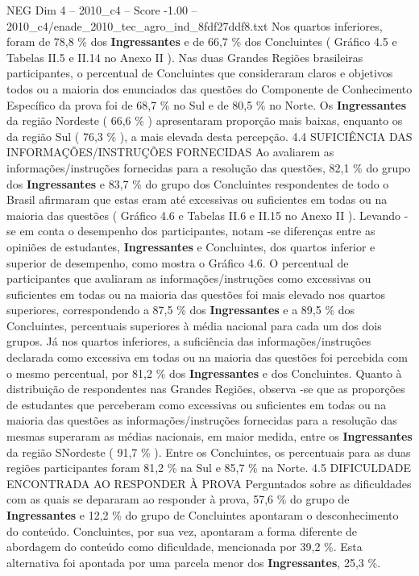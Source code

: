 \begin{textsample}{NEG Dim 4 – 2010\_c4 – Score -1.00 – 2010\_c4/enade\_2010\_tec\_agro\_ind\_8fdf27ddf8.txt}
Nos quartos inferiores, foram de 78,8 \% dos \textbf{Ingressantes} e de 66,7 \% dos Concluintes ( Gráfico 4.5 e Tabelas II.5 e II.14 no Anexo II ).
Nas duas Grandes Regiões brasileiras participantes, o percentual de Concluintes que consideraram claros e objetivos todos ou a maioria dos enunciados das questões do Componente de Conhecimento Específico da prova foi de 68,7 \% no Sul e de 80,5 \% no Norte.
Os \textbf{Ingressantes} da região Nordeste ( 66,6 \% ) apresentaram proporção mais baixas, enquanto os da região Sul ( 76,3 \% ), a mais elevada desta percepção. 4.4 SUFICIÊNCIA DAS INFORMAÇÕES/INSTRUÇÕES FORNECIDAS Ao avaliarem as informações/instruções fornecidas para a resolução das questões, 82,1 \% do grupo dos \textbf{Ingressantes} e 83,7 \% do grupo dos Concluintes respondentes de todo o Brasil afirmaram que estas eram até excessivas ou suficientes em todas ou na maioria das questões ( Gráfico 4.6 e Tabelas II.6 e II.15 no Anexo II ).
Levando -se em conta o desempenho dos participantes, notam -se diferenças entre as opiniões de estudantes, \textbf{Ingressantes} e Concluintes, dos quartos inferior e superior de desempenho, como mostra o Gráfico 4.6.
O percentual de participantes que avaliaram as informações/instruções como excessivas ou suficientes em todas ou na maioria das questões foi mais elevado nos quartos superiores, correspondendo a 87,5 \% dos \textbf{Ingressantes} e a 89,5 \% dos Concluintes, percentuais superiores à média nacional para cada um dos dois grupos.
Já nos quartos inferiores, a suficiência das informações/instruções declarada como excessiva em todas ou na maioria das questões foi percebida com o mesmo percentual, por 81,2 \% dos \textbf{Ingressantes} e dos Concluintes.
Quanto à distribuição de respondentes nas Grandes Regiões, observa -se que as proporções de estudantes que perceberam como excessivas ou suficientes em todas ou na maioria das questões as informações/instruções fornecidas para a resolução das mesmas superaram as médias nacionais, em maior medida, entre os \textbf{Ingressantes} da região SNordeste ( 91,7 \% ).
Entre os Concluintes, os percentuais para as duas regiões participantes foram 81,2 \% na Sul e 85,7 \% na Norte. 4.5 DIFICULDADE ENCONTRADA AO RESPONDER À PROVA Perguntados sobre as dificuldades com as quais se depararam ao responder à prova, 57,6 \% do grupo de \textbf{Ingressantes} e 12,2 \% do grupo de Concluintes apontaram o desconhecimento do conteúdo.
Concluintes, por sua vez, apontaram a forma diferente de abordagem do conteúdo como dificuldade, mencionada por 39,2 \%.
Esta alternativa foi apontada por uma parcela menor dos \textbf{Ingressantes}, 25,3 \%.

\end{textsample}
